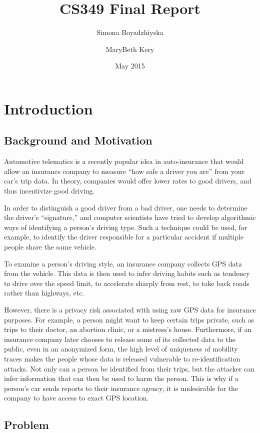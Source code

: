 \documentclass{article}
\title{CS349 Final Report} %
\author{Simona Boyadzhiyska \and MaryBeth Kery}
\date{May 2015}
\begin{document}
\maketitle

\section{Introduction}
\subsection{Background and Motivation}

Automotive telematics is a recently popular idea in auto-insurance that would allow an insurance company to measure ``how safe a driver you are'' from your car's trip data. In theory, companies would offer lower rates to good drivers, and thus incentivize good driving.

In order to distinguish a good driver from a bad driver, one needs to determine the driver's ``signature,'' and computer scientists have tried to develop algorithmic ways of identifying a person's driving type. Such a technique could be used, for example, to identify the driver responsible for a particular accident if multiple people share the same vehicle.

To examine a person's driving style, an insurance company collects GPS data from the vehicle. This data is then used to infer driving habits such as tendency to drive over the speed limit, to accelerate sharply from rest, to take back roads rather than highways, etc.

However, there is a privacy risk associated with using raw GPS data for insurance purposes. For example, a person might want to keep certain trips private, such as trips to their doctor, an abortion clinic, or a mistress's house. Furthermore, if an insurance company later chooses to release some of its collected data to the public, even in an anonymized form, the high level of uniqueness of mobility traces makes the people whose data is released vulnerable to re-identification attacks. Not only can a person be identified from their trips, but the attacker can infer information that can then be used to harm the person. This is why if a person's car sends reports to their insurance agency, it is undesirable for the company to have access to exact GPS location.

\subsection{Problem}
\end{document}
